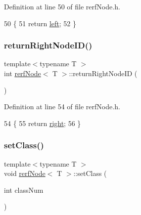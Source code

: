 Definition at line 50 of file rerf\+Node.\+h.


\begin{DoxyCode}
50                                      \{
51             \textcolor{keywordflow}{return} \hyperlink{classrerfNode_a0ffbd4e13914bfdd0d35e2e737b0a959}{left};    
52         \}
\end{DoxyCode}
\mbox{\label{classrerfNode_a0f183e7683ebd7683f003db3eaa9a4a6}} 
\subsubsection{\texorpdfstring{return\+Right\+Node\+I\+D()}{returnRightNodeID()}}
{\footnotesize\ttfamily template$<$typename T $>$ \\
int \hyperlink{classrerfNode}{rerf\+Node}$<$ T $>$\+::return\+Right\+Node\+ID (\begin{DoxyParamCaption}{ }\end{DoxyParamCaption})\hspace{0.3cm}{\ttfamily [inline]}}



Definition at line 54 of file rerf\+Node.\+h.


\begin{DoxyCode}
54                                       \{
55             \textcolor{keywordflow}{return} \hyperlink{classrerfNode_ae04521c833fe33f2b1cde19bb3cb615f}{right};
56         \}
\end{DoxyCode}
\mbox{\label{classrerfNode_af150e653daddcde22261e3e12ebc2986}} 
\subsubsection{\texorpdfstring{set\+Class()}{setClass()}}
{\footnotesize\ttfamily template$<$typename T $>$ \\
void \hyperlink{classrerfNode}{rerf\+Node}$<$ T $>$\+::set\+Class (\begin{DoxyParamCaption}\item[{int}]{class\+Num }\end{DoxyParamCaption})\hspace{0.3cm}{\ttfamily [inline]}}



